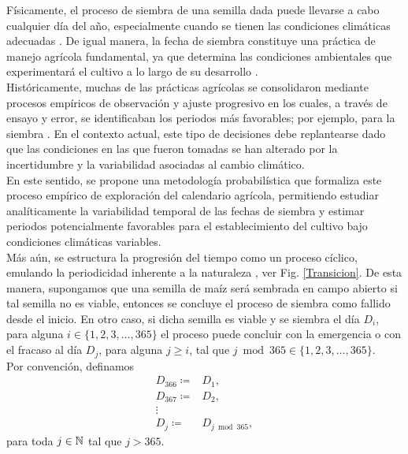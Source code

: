 Físicamente, el proceso de siembra de una semilla dada puede llevarse a cabo cualquier día del año, especialmente cuando se tienen las condiciones climáticas adecuadas \cite{Qiao_2023}. De igual manera, la fecha de siembra constituye una práctica de manejo agrícola fundamental, ya que determina las condiciones ambientales que experimentará el cultivo a lo largo de su desarrollo \cite{Sadeh_2024}.\\

Históricamente, muchas de las prácticas agrícolas se consolidaron mediante procesos empíricos de observación y ajuste progresivo en los cuales, a través de ensayo y error, se identificaban los periodos más favorables; por ejemplo, para la siembra \cite{NRC_1996}. En el contexto actual, este tipo de decisiones debe replantearse dado que las condiciones en las que fueron tomadas se han alterado por la incertidumbre y la variabilidad asociadas al cambio climático.\\

En este sentido, se propone una metodología probabilística que formaliza este proceso empírico de exploración del calendario agrícola, permitiendo estudiar analíticamente la variabilidad temporal de las fechas de siembra y estimar periodos potencialmente favorables para el establecimiento del cultivo bajo condiciones climáticas variables.\\


Más aún, se estructura la progresión del tiempo como un proceso cíclico, emulando  la periodicidad inherente a la naturaleza \cite{Chuine_2017,Gatto_2015,Gurney_1992,Mardia1999,Powell_2005,Regniere_2013}, ver Fig. \ref{Transicion}. De esta manera, supongamos que una semilla de maíz será sembrada en campo abierto si tal semilla no es viable, entonces se concluye el proceso de siembra como fallido desde el inicio. En otro caso, si dicha semilla es viable y se siembra el día $D_i$, para alguna $i\in\{1,2,3,\ldots, 365\}$ el proceso puede concluir con la emergencia o con el fracaso al día $D_j$, para alguna $j\geq i$, tal que $j\bmod{365} \in \{1,2,3,\ldots, 365\}$.\\

Por convención, definamos 
	\begin{align}
		D_{366}\coloneqq& D_{1},\\
		D_{367}\coloneqq& D_{2},\\
		\nonumber\vdots& \\
		D_{j}\coloneqq& D_{j\bmod{365}},
	\end{align}para toda $j\in \mathbb{N}$ tal que $j>365$.\\
	
